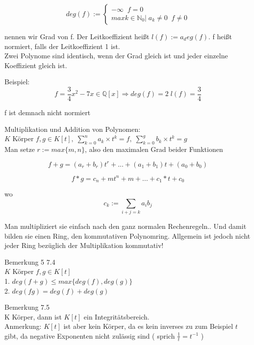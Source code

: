 \documentclass[smallheadings,12pt,a4paper]{scrartcl}
\begin{document}
\item $$ \textit{deg}(f):=\begin{cases} - \infty \; \; f = 0 \\
max{k \in \mathbb{N}_0 | \; a_k \neq 0}    \; \; f \neq 0 
\end{cases}$$

nennen wir Grad von f. Der Leitkoeffizient heißt $l(f):=a_deg(f)$. f heißt normiert, falls der Leitkoeffizient 1 ist. \\

Zwei Polynome sind identisch, wenn der Grad gleich ist und jeder einzelne Koeffizient gleich ist. \\

\item Beispiel: \\
$$ f = \frac{3}{4}x^2 -7x \in \mathbb{Q}[x] \Rightarrow deg(f) = 2  \; l(f) = \frac{3}{4} $$

f ist demnach nicht normiert

\newpage


\item Multiplikation und Addition von Polynomen:\\
$ K $ Körper $ f,g \in K[t] ,   \;  \sum\limits_{k=0}^n a_k \times t^k = f , \;  \sum\limits_{k=0}^g b_k \times t^k = g $ \\

Man setze $r:= max\{m,n\}$, also den maximalen Grad beider Funktionen

$$ f+g = (a_r+b_r)t^r+...+(a_1+b_1)t+(a_0+b_0) $$

$$ f*g = c_n+m t^n+m + ... + c_1 * t + c_0 $$

wo $$ c_k:= \sum\limits_{i+j=k} a_i b_j $$

Man multipliziert sie einfach nach den ganz normalen Rechenregeln.. Und damit bilden sie einen Ring, den kommutativen Polynomring. Allgemein ist jedoch nicht jeder Ring bezüglich der Multiplikation kommutativ! \\

\item Bemerkung 5 7.4 \\
$ K $ Körper $ f,g \in K[t] $ \\

1. $deg(f+g) \leq max \{deg(f),deg(g)\} $ \\
2. $ deg(fg) = deg(f)+deg(g) $ \\

\item Bemerkung 7.5 \\
K Körper, dann ist $K[t]$ ein Integritätsbereich.  \\
Anmerkung: $K[t]$ ist aber kein Körper, da es kein inverses zu zum Beispiel $t$ gibt, da negative Exponenten nicht zulässig sind ( sprich $ \frac{1}{t} = t^{-1} $ )
\end{document}
